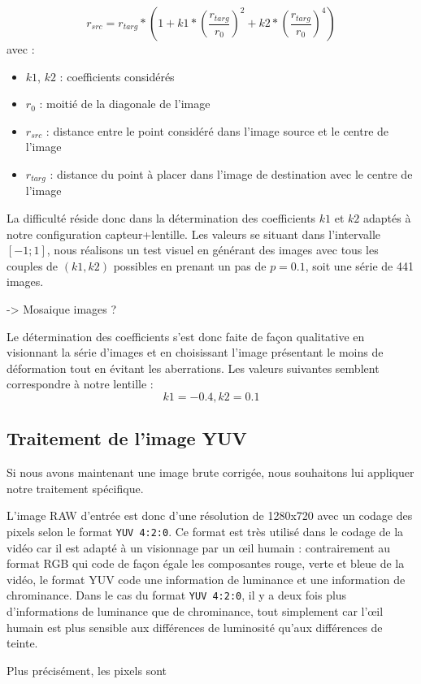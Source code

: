 \documentclass[11pt,a4paper]{article}
\begin{document}
$$r_{src} = r_{targ} * (1 + k1*(\frac{r_{targ}}{r_0})^2 + k2*(\frac{r_{targ}}{r_0})^4)$$
avec :
\begin{itemize}
\item{$k1$, $k2$ : coefficients considérés}
\item{$r_0$ : moitié de la diagonale de l'image}
\item{$r_{src}$ : distance entre le point considéré dans l'image source et le centre de l'image}
\item{$r_{targ}$ : distance du point à placer dans l'image de destination avec le centre de l'image}
\end{itemize}

\bigbreak

La difficulté réside donc dans la détermination des coefficients $k1$ et $k2$ adaptés à notre configuration capteur+lentille.
Les valeurs se situant dans l'intervalle $[-1;1]$, nous réalisons un test visuel en générant des images avec tous les couples de $(k1, k2)$ possibles en prenant un pas de $p=0.1$, soit une série de 441 images.

\bigbreak
-> Mosaique images ?

\bigbreak
Le détermination des coefficients s'est donc faite de façon qualitative en visionnant la série d'images et en choisissant l'image présentant le moins de déformation tout en évitant les aberrations.
Les valeurs suivantes semblent correspondre à notre lentille :
$$k1 = -0.4, k2 = 0.1$$

\subsection{Traitement de l'image YUV}
Si nous avons maintenant une image brute corrigée, nous souhaitons lui appliquer notre traitement spécifique.

\bigbreak
L'image RAW d'entrée est donc d'une résolution de 1280x720 avec un codage des pixels selon le format \texttt{YUV 4:2:0}.
Ce format est très utilisé dans le codage de la vidéo car il est adapté à un visionnage par un œil humain : contrairement au format RGB qui code de façon égale les composantes rouge, verte et bleue de la vidéo, le format YUV code une information de luminance et une information de chrominance.
Dans le cas du format \texttt{YUV 4:2:0}, il y a deux fois plus d'informations de luminance que de chrominance, tout simplement car l'œil humain est plus sensible aux différences de luminosité qu'aux différences de teinte.

\bigbreak
Plus précisément, les pixels sont  
\end{document}
